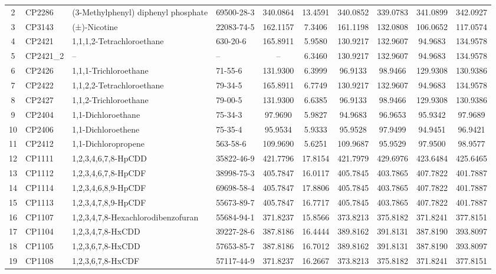 \begin{longtable}{clllcccccc}
2 & CP2286 & (3-Methylphenyl) diphenyl phosphate & 69500-28-3 & 340.0864 & 13.4591 & 340.0852 & 339.0783 & 341.0899 & 342.0927 \\ 
3 & CP3143 & (±)-Nicotine & 22083-74-5 & 162.1157 & 7.3406 & 161.1198 & 132.0808 & 106.0652 & 117.0574 \\ 
4 & CP2421 & 1,1,1,2-Tetrachloroethane & 630-20-6 & 165.8911 & 5.9580 & 130.9217 & 132.9607 & 94.9683 & 134.9578 \\ 
5 & CP2421\_2 & – & – & – & 6.3460 & 130.9217 & 132.9607 & 94.9683 & 134.9578 \\ 
6 & CP2426 & 1,1,1-Trichloroethane & 71-55-6 & 131.9300 & 6.3999 & 96.9133 & 98.9466 & 129.9308 & 130.9386 \\ 
7 & CP2422 & 1,1,2,2-Tetrachloroethane & 79-34-5 & 165.8911 & 6.7749 & 130.9217 & 132.9607 & 94.9683 & 134.9578 \\ 
8 & CP2427 & 1,1,2-Trichloroethane & 79-00-5 & 131.9300 & 6.6385 & 96.9133 & 98.9466 & 129.9308 & 130.9386 \\ 
9 & CP2404 & 1,1-Dichloroethane & 75-34-3 & 97.9690 & 5.9827 & 94.9683 & 96.9653 & 95.9342 & 97.9689 \\ 
10 & CP2406 & 1,1-Dichloroethene & 75-35-4 & 95.9534 & 5.9333 & 95.9528 & 97.9499 & 94.9451 & 96.9421 \\ 
11 & CP2412 & 1,1-Dichloropropene & 563-58-6 & 109.9690 & 5.6251 & 109.9687 & 95.9529 & 97.9500 & 98.9577 \\ 
12 & CP1111 & 1,2,3,4,6,7,8-HpCDD & 35822-46-9 & 421.7796 & 17.8154 & 421.7979 & 429.6976 & 423.6484 & 425.6465 \\ 
13 & CP1112 & 1,2,3,4,6,7,8-HpCDF & 38998-75-3 & 405.7847 & 16.0117 & 405.7845 & 403.7865 & 407.7822 & 401.7887 \\ 
14 & CP1114 & 1,2,3,4,6,8,9-HpCDF & 69698-58-4 & 405.7847 & 17.8806 & 405.7845 & 403.7865 & 407.7822 & 401.7887 \\ 
15 & CP1113 & 1,2,3,4,7,8,9-HpCDF & 55673-89-7 & 405.7847 & 16.7717 & 405.7845 & 403.7865 & 407.7822 & 401.7887 \\ 
16 & CP1107 & 1,2,3,4,7,8-Hexachlorodibenzofuran & 55684-94-1 & 371.8237 & 15.8566 & 373.8213 & 375.8182 & 371.8241 & 377.8151 \\ 
17 & CP1104 & 1,2,3,4,7,8-HxCDD & 39227-28-6 & 387.8186 & 16.4444 & 389.8162 & 391.8131 & 387.8190 & 393.8097 \\ 
18 & CP1105 & 1,2,3,6,7,8-HxCDD & 57653-85-7 & 387.8186 & 16.7012 & 389.8162 & 391.8131 & 387.8190 & 393.8097 \\ 
19 & CP1108 & 1,2,3,6,7,8-HxCDF & 57117-44-9 & 371.8237 & 16.2667 & 373.8213 & 375.8182 & 371.8241 & 377.8151 \\ 

\end{longtable}
